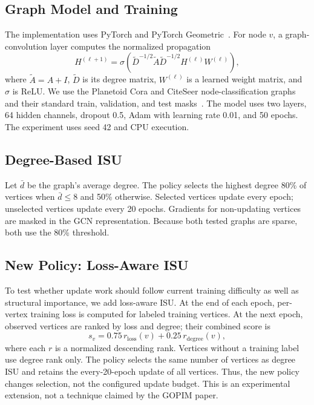 \documentclass[conference]{IEEEtran}
\begin{document}
\subsection{Graph Model and Training}
The implementation uses PyTorch and PyTorch Geometric~\cite{fey2019pyg}.
For node $v$, a graph-convolution layer computes the normalized propagation
\begin{equation}
  H^{(\ell+1)} =
  \sigma\!\left(\widetilde{D}^{-1/2}\widetilde{A}
  \widetilde{D}^{-1/2} H^{(\ell)} W^{(\ell)}\right),
\end{equation}
where $\widetilde{A}=A+I$, $\widetilde{D}$ is its degree matrix, $W^{(\ell)}$
is a learned weight matrix, and $\sigma$ is ReLU. We use the Planetoid Cora
and CiteSeer node-classification graphs and their standard train, validation,
and test masks~\cite{yang2016planetoid}. The model uses two layers, 64 hidden
channels, dropout 0.5, Adam with learning rate 0.01, and 50 epochs. The
experiment uses seed 42 and CPU execution.

\subsection{Degree-Based ISU}
Let $\bar d$ be the graph's average degree. The policy selects the highest
degree 80\% of vertices when $\bar d\leq 8$ and 50\% otherwise. Selected
vertices update every epoch; unselected vertices update every 20 epochs.
Gradients for non-updating vertices are masked in the GCN representation.
Because both tested graphs are sparse, both use the 80\% threshold.

\subsection{New Policy: Loss-Aware ISU}
To test whether update work should follow current training difficulty as well
as structural importance, we add loss-aware ISU. At the end of each epoch,
per-vertex training loss is computed for labeled training vertices. At the
next epoch, observed vertices are ranked by loss and degree; their combined
score is
\begin{equation}
  s_v = 0.75\,r_{\mathrm{loss}}(v)
      + 0.25\,r_{\mathrm{degree}}(v),
\end{equation}
where each $r$ is a normalized descending rank. Vertices without a training
label use degree rank only. The policy selects the same number of vertices
as degree ISU and retains the every-20-epoch update of all vertices. Thus,
the new policy changes selection, not the configured update budget. This is
an experimental extension, not a technique claimed by the GOPIM paper.
\end{document}
